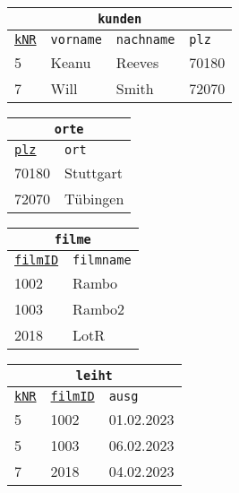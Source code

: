 \begin{minipage}{\textwidth}
	\begin{minipage}{0.4\textwidth}
		\begin{tabular}{llll}
			\multicolumn{4}{c}{\lstinline!kunden!}\\
			\hline
			\underline{\lstinline!kNR!}&\lstinline!vorname!&\lstinline!nachname!&\lstinline!plz!\\
			\hline
			5&Keanu&Reeves&70180\\
			7&Will&Smith&72070\\
		\end{tabular}
	\end{minipage}
	\begin{minipage}{0.25\textwidth}
		\begin{tabular}{ll}
			\multicolumn{2}{c}{\lstinline!orte!}\\
			\hline
			\underline{\lstinline!plz!}&\lstinline!ort!\\
			\hline
			70180&Stuttgart\\
			72070&Tübingen\\
		\end{tabular}
	\end{minipage}
\end{minipage}
\begin{minipage}{0.4\textwidth}
	\begin{tabular}{ll}
		\multicolumn{2}{c}{\lstinline!filme!}\\
		\hline
		\underline{\lstinline!filmID!}&\lstinline!filmname!\\
		\hline
		1002&Rambo\\
		1003&Rambo2\\
		2018&LotR\\
	\end{tabular}
\end{minipage}
		\begin{minipage}{0.3\textwidth}
	\begin{tabular}{lll}
		\multicolumn{3}{c}{\lstinline!leiht!}\\
		\hline
		\underline{\lstinline!kNR!}&\underline{\lstinline!filmID!}&\lstinline!ausg!\\
		\hline
		5&1002&01.02.2023\\
		5&1003&06.02.2023\\
		7&2018&04.02.2023\\
	\end{tabular}
\end{minipage}

